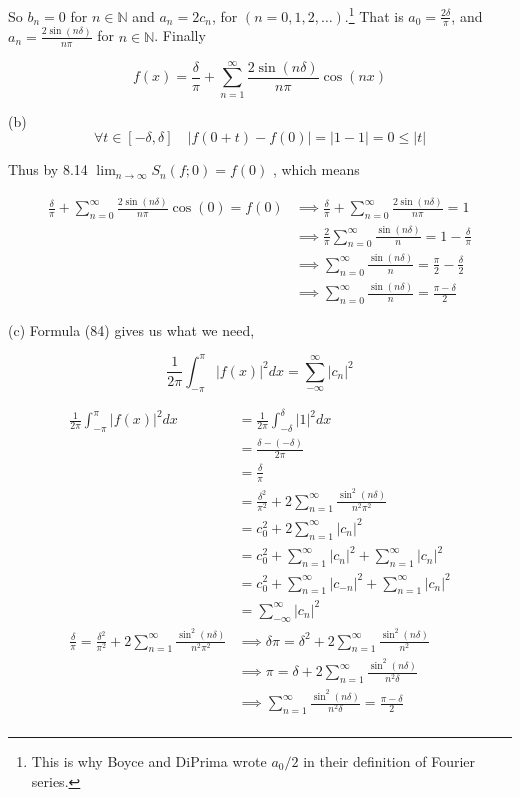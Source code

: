 \documentclass{article}
\newcommand\N{\mathbb{N}}
\begin{document}
So $b_n = 0$ for $n\in \N$ and $a_n = 2c_n$, for $(n = 0,1, 2,
\dots)$.\footnote{This is why Boyce and DiPrima wrote $a_0/2$ in their
  definition of Fourier series.}
That is $a_0 =\frac{2\delta}{\pi}$, and $a_n =
\frac{2\sin(n\delta)}{n\pi}$ for $n\in \N$. Finally

\[f(x) = \frac{\delta}{\pi} +\sum_{n=1}^\infty \frac{2\sin(n\delta)}{n\pi}\cos(nx)   \]

\newpage
(b)
\[\forall t\in [-\delta,\delta]\quad  |f(0+t) -f(0)| = |1-1| = 0 \leq |t|\]

Thus by 8.14 $\lim_{n\rightarrow \infty}S_n(f;0) = f(0)$ , which means

\begin{align*}
  \frac{\delta}{\pi} +\sum_{n=0}^\infty   \frac{2\sin(n\delta)}{n\pi}\cos(0) = f(0)
  &\implies \frac{\delta}{\pi} +\sum_{n=0}^\infty
                                          \frac{2\sin(n\delta)}{n\pi}
    = 1 \\
  &\implies \frac{2}{\pi} \sum_{n=0}^\infty
                                          \frac{\sin(n\delta)}{n}
    = 1 - \frac{\delta}{\pi}\\
  &\implies \sum_{n=0}^\infty
                                          \frac{\sin(n\delta)}{n}
    = \frac{\pi}{2} - \frac{\delta}{2}\\
  &\implies \sum_{n=0}^\infty
                                          \frac{\sin(n\delta)}{n}
    = \frac{\pi-\delta}{2}
\end{align*}

(c)
Formula (84) gives us what we need,

\[\frac{1}{2\pi} \int_{-\pi}^\pi |f(x)|^2 dx = \sum_{-\infty}^\infty |c_n|^2\]

\begin{align*}
  \frac{1}{2\pi} \int_{-\pi}^\pi |f(x)|^2 dx
  &= \frac{1}{2\pi} \int_{-\delta}^\delta |1|^2 dx\\
  &=    \frac{\delta-(-\delta)}{2\pi}\\
  &= \frac{\delta}{\pi}\\
  &= \frac{\delta^2}{\pi^2} + 2\sum_{n=1}^\infty
    \frac{\sin^2(n\delta)}{n^2\pi^2}\\
  &= c_0^2 + 2\sum_{n=1}^\infty |c_n|^2\\
  &= c_0^2 + \sum_{n=1}^\infty |c_n|^2+\sum_{n=1}^\infty |c_n|^2\\
  &= c_0^2 + \sum_{n=1}^\infty |c_{-n}|^2+\sum_{n=1}^\infty |c_n|^2\\
  &= \sum_{-\infty}^\infty |c_n|^2\\
\frac{\delta}{\pi}
  = \frac{\delta^2}{\pi^2} + 2\sum_{n=1}^\infty
  \frac{\sin^2(n\delta)}{n^2\pi^2}
  &\implies \delta\pi  =\delta^2 + 2\sum_{n=1}^\infty
    \frac{\sin^2(n\delta)}{n^2}\\
  &\implies \pi  =\delta + 2\sum_{n=1}^\infty
    \frac{\sin^2(n\delta)}{n^2\delta}\\
  &\implies \sum_{n=1}^\infty
    \frac{\sin^2(n\delta)}{n^2\delta} = \frac{\pi-\delta}{2}\\
\end{align*}
\end{document}
